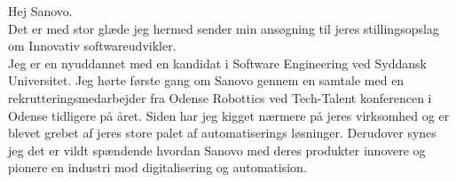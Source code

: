 \documentclass[10pt,a4paper]{altacv}
\begin{document}


\makecvheader




Hej Sanovo.
\\
\vspace{5mm}
Det er med stor glæde jeg hermed sender min ansøgning til jeres stillingsopslag om Innovativ softwareudvikler.
\\
\vspace{5mm}
Jeg er en nyuddannet med en kandidat i Software Engineering ved Syddansk Universitet.
Jeg hørte første gang om Sanovo gennem en samtale med en rekrutteringsmedarbejder fra Odense Robottics ved Tech-Talent konferencen i Odense tidligere på året.
Siden har jeg kigget nærmere på jeres virksomhed og er blevet grebet af jeres store palet af automatiserings løsninger.
Derudover synes jeg det er vildt spændende hvordan Sanovo med deres produkter innovere og pionere en industri mod digitalisering og automatision.
\\
\end{document}
